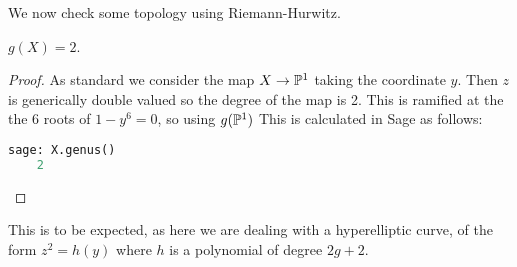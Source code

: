\documentclass{article}
\begin{document}
We now check some topology using Riemann-Hurwitz. 
\begin{prop}
	$g(X) = 2$.
\end{prop}
\begin{proof}
	As standard we consider the map $X\to \mathbb{P}^1$ taking the coordinate $y$. Then $z$ is generically double valued so the degree of the map is 2. This is ramified at the the 6 roots of $1-y^6=0$, so using $g(\mathbb{P}^1)$
	This is calculated in Sage as follows:
	\begin{lstlisting}[language=Python,frame=single]
	sage: X.genus()
	2
	\end{lstlisting}
\end{proof}
\begin{remark}
	This is to be expected, as here we are dealing with a hyperelliptic curve, of the form $z^2=h(y)$ where $h$ is a polynomial of degree $2g+2$. 
\end{remark}
\end{document}
